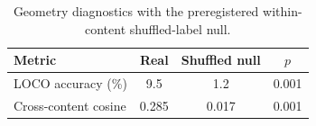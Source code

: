 \begin{table}[t]
\centering
\caption{Geometry diagnostics with the preregistered within-content shuffled-label null.}
\label{tab:geometry}
\begin{tabular}{lccc}
\hline
Metric & Real & Shuffled null & $p$ \\
\hline
LOCO accuracy (\%) & 9.5 & 1.2 & 0.001 \\
Cross-content cosine & 0.285 & 0.017 & 0.001 \\
\hline
\end{tabular}
\end{table}
